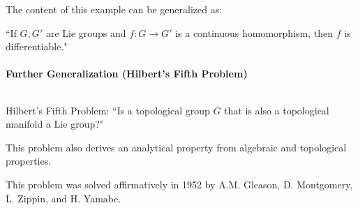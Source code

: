 \documentclass[uplatex,a4j,12pt,dvipdfmx]{jsarticle}
\begin{document}
The content of this example can be generalized as:

``If $G,G'$ are Lie groups and $f: G \to G'$ is a continuous homomorphism, then $f$ is differentiable."

\paragraph{Further Generalization (Hilbert's Fifth Problem)}

${}$

Hilbert's Fifth Problem:
``Is a topological group $G$ that is also a topological manifold a Lie group?"

This problem also derives an analytical property from algebraic and topological properties.

This problem was solved affirmatively in 1952 by
A.M. Gleason, D. Montgomery, L. Zippin, and H. Yamabe.
\end{document}

